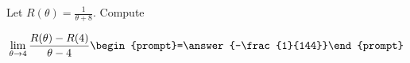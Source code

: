\documentclass{ximera}
\author{Bart Snapp}
\begin{document}
\begin{exercise}
Let $R(\theta) = \frac{1}{\theta +8}$. Compute

\[
\lim_{ \theta\to 4 } 
\frac{R(\theta)-R(4)}{\theta -4} \begin{prompt}=\answer{-\frac{1}{144}}\end{prompt}
\]
\end{exercise}
\end{document}
